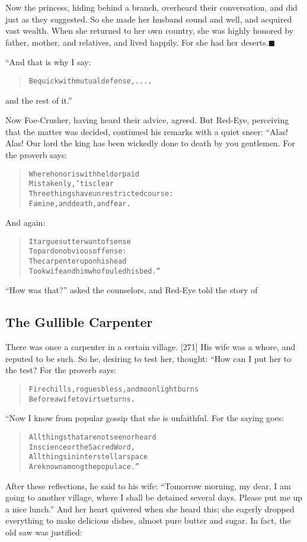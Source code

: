\documentclass[article, twoside, 14pt]{memoir}
\newcommand{\qed}{\hfill \ensuremath{\blacksquare}}
\renewenvironment{verbatim}{%
\begin{quote}%
\vskip -10pt%
\begin{alltt}\normalfont\large}{\end{alltt}%
\end{quote}%
\vskip -10pt
} %
\begin{document}
Now the princess, hiding behind a branch, overheard their
conversation, and did just as they suggested. So she made her
husband sound and well, and acquired vast wealth. When she returned
to her own country, she was highly honored by father, mother, and
relatives, and lived happily. For she had her
deserts.\hyperref[s58]{\qed}

“And that is why I say:

\begin{verbatim}
Be quick with mutual defense, ....
\end{verbatim}
and the rest of it.”

Now Foe-Crusher, having heard their advice, agreed. But Red-Eye,
perceiving that the matter was decided, continued his remarks with
a quiet sneer: “Alas! Alas! Our lord the king has been wickedly
done to death by you gentlemen. For the proverb says:

\begin{verbatim}
Where honor is withheld or paid
    Mistakenly, 'tis clear
Three things have unrestricted course:
    Famine, and death, and fear.
\end{verbatim}
And again:

\begin{verbatim}
It argues utter want of sense
To pardon obvious offense:
The carpenter upon his head
Took wife and him who fouled his bed.”
\end{verbatim}
``How was that?'' asked the counselors, and Red-Eye told the story
of

\subsection{The Gullible Carpenter}

\label{s59}

There was once a carpenter in a certain village. [271] His wife was
a whore, and reputed to be such. So he, desiring to test her,
thought: “How can I put her to the test? For the proverb says:

\begin{verbatim}
Fire chills, rogues bless, and moonlight burns
Before a wife to virtue turns.
\end{verbatim}
“Now I know from popular gossip that she is unfaithful. For the
saying goes:

\begin{verbatim}
All things that are not seen or heard
In science or the Sacred Word,
All things in interstellar space
Are known among the populace.”
\end{verbatim}
After these reflections, he said to his wife:
``Tomorrow morning, my dear, I am going to another village, where I shall be detained several days. Please put me up a nice lunch.''
And her heart quivered when she heard this; she eagerly dropped
everything to make delicious dishes, almost pure butter and sugar.
In fact, the old saw was justified:
\end{document}
